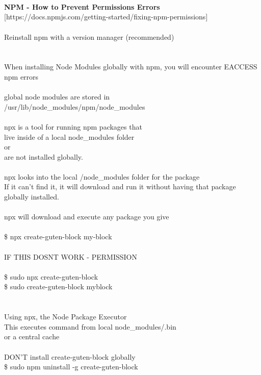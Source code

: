 \documentclass[10pt,a4paper]{article}
\begin{document}
{{{{{{{{{{{{{{{{\\
\\
\\
\textbf{NPM - How to Prevent Permissions Errors}}{\large \\
[https://docs.npmjs.com/getting-started/fixing-npm-permissions}{\large ]\\
\\
Reinstall npm with a version manager (recommended)\\
\\
\\
When installing Node Modules globally with npm, you will encounter EACCESS npm errors\\
\\
global node modules are stored in\\
/usr/lib/node\_modules/npm/node\_modules}{\large \\
\\
npx is a tool for running npm packages that \\
live inside of a local node\_modules folder \\
or \\
are not installed globally.\\
\\
npx looks into the local /node\_modules folder for the package \\
If it can’t find it, it will download and run it without having that package globally installed.\\
\\
npx will download and execute any package you give\\
\\
\$ npx create-guten-block my-block\\
\\
IF THIS DOSNT WORK - PERMISSION\\
\\
\$ sudo npx create-guten-block\\
}{\large \$ sudo create-guten-block myblock}{\large \\
\\
\\
Using npx, the Node Package Executor\\
This executes command from local node\_modules/.bin\\
or a central cache\\
\\
DON'T install create-guten-block globally\\
\$ sudo npm uninstall -g create-guten-block\\
}}}}}}}}}}}}}}}}
\end{document}

